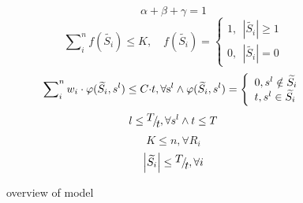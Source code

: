 \documentclass[conference,compsoc]{IEEEtran}
\begin{document}
\begin{equation}
\alpha  + \beta  + \gamma  = 1
\end{equation}
\begin{equation}
\sum\nolimits_i^n {f(\widetilde {{S_i}}) \le } K,\quad f(\widetilde {{S_i}}) = \left\{ \begin{array}{l}
1,\ \ \left| {\widetilde {{S_i}}} \right| \ge 1\\
0,\ \ \left| {\widetilde {{S_i}}} \right| = 0
\end{array} \right.
\end{equation}
\begin{equation}
\sum\nolimits_i^n {{w_i} \cdot \varphi (\widetilde {{S_i}},{s^l}) \le C \cdot } t,{\rm{  }}\forall {{\rm{s}}^l} \wedge \varphi (\widetilde {{S_i}},{s^l}) = \left\{ \begin{array}{l}
0,{s^l} \notin \widetilde {{S_i}}\\
t,{s^l} \in \widetilde {{S_i}}
\end{array} \right.
\end{equation}
\begin{equation}
l \le {\raise0.7ex\hbox{$T$} \!\mathord{\left/
 {\vphantom {T t}}\right.\kern-\nulldelimiterspace}
\!\lower0.7ex\hbox{$t$}},\forall {s^l} \wedge t \le T
\end{equation}
\begin{equation}
K \le n,\forall {R_i}
\end{equation}
\begin{equation}
\left| {\widetilde {{S_i}}} \right| \le {\raise0.7ex\hbox{$T$} \!\mathord{\left/
 {\vphantom {T t}}\right.\kern-\nulldelimiterspace}
\!\lower0.7ex\hbox{$t$}},\forall i
\end{equation}

\begin{figure}[!!!!!!!!!!!!!!hhhhhhhhhht]
\centering
{}

 
\caption{overview of model}
\label{fig_1_model}
\end{figure}
\end{document}
